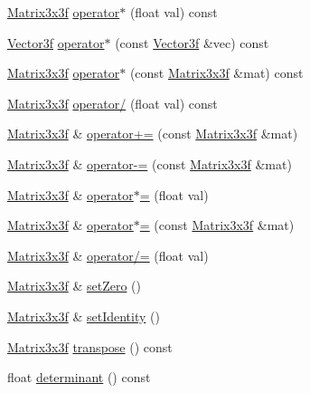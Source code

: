 \begin{DoxyCompactItemize}
\item 
\hyperlink{classh2_1_1_matrix3x3f}{Matrix3x3f} \hyperlink{classh2_1_1_matrix3x3f_aad83dee4aafc00b48106b710dcc8f3bb}{operator$\ast$} (float val) const 
\item 
\hyperlink{classh2_1_1_vector3f}{Vector3f} \hyperlink{classh2_1_1_matrix3x3f_a08c8c6fccec3ef954e6dfd41873c896e}{operator$\ast$} (const \hyperlink{classh2_1_1_vector3f}{Vector3f} \&vec) const 
\item 
\hyperlink{classh2_1_1_matrix3x3f}{Matrix3x3f} \hyperlink{classh2_1_1_matrix3x3f_af89252ea191076fbec64f6d5d919681d}{operator$\ast$} (const \hyperlink{classh2_1_1_matrix3x3f}{Matrix3x3f} \&mat) const 
\item 
\hyperlink{classh2_1_1_matrix3x3f}{Matrix3x3f} \hyperlink{classh2_1_1_matrix3x3f_a3f14554ae5ca6b6efb0ec1f80cf20da9}{operator/} (float val) const 
\item 
\hyperlink{classh2_1_1_matrix3x3f}{Matrix3x3f} \& \hyperlink{classh2_1_1_matrix3x3f_a3dd230235d73b30e65e244b2db8aa331}{operator+=} (const \hyperlink{classh2_1_1_matrix3x3f}{Matrix3x3f} \&mat)
\item 
\hyperlink{classh2_1_1_matrix3x3f}{Matrix3x3f} \& \hyperlink{classh2_1_1_matrix3x3f_a2c203940c3f57d867105be0ee6970825}{operator-\/=} (const \hyperlink{classh2_1_1_matrix3x3f}{Matrix3x3f} \&mat)
\item 
\hyperlink{classh2_1_1_matrix3x3f}{Matrix3x3f} \& \hyperlink{classh2_1_1_matrix3x3f_ab8dd481034015b4e94eeee591e36efcd}{operator$\ast$=} (float val)
\item 
\hyperlink{classh2_1_1_matrix3x3f}{Matrix3x3f} \& \hyperlink{classh2_1_1_matrix3x3f_afb43ef0063cfb3f5d517cc6a8311fd34}{operator$\ast$=} (const \hyperlink{classh2_1_1_matrix3x3f}{Matrix3x3f} \&mat)
\item 
\hyperlink{classh2_1_1_matrix3x3f}{Matrix3x3f} \& \hyperlink{classh2_1_1_matrix3x3f_a1e12570c60988838943176c233abe405}{operator/=} (float val)
\item 
\hyperlink{classh2_1_1_matrix3x3f}{Matrix3x3f} \& \hyperlink{classh2_1_1_matrix3x3f_a6725c200f61b9f46321035024e7b8a34}{set\-Zero} ()
\item 
\hyperlink{classh2_1_1_matrix3x3f}{Matrix3x3f} \& \hyperlink{classh2_1_1_matrix3x3f_a3e5125f3dd5a0834e2a0aadc8a273562}{set\-Identity} ()
\item 
\hyperlink{classh2_1_1_matrix3x3f}{Matrix3x3f} \hyperlink{classh2_1_1_matrix3x3f_a512a3e9a6e7be6e7db8efe9cbddfcb7d}{transpose} () const 
\item 
float \hyperlink{classh2_1_1_matrix3x3f_a288945160ebc89663f432a57b2750a0a}{determinant} () const 

\end{DoxyCompactItemize}
